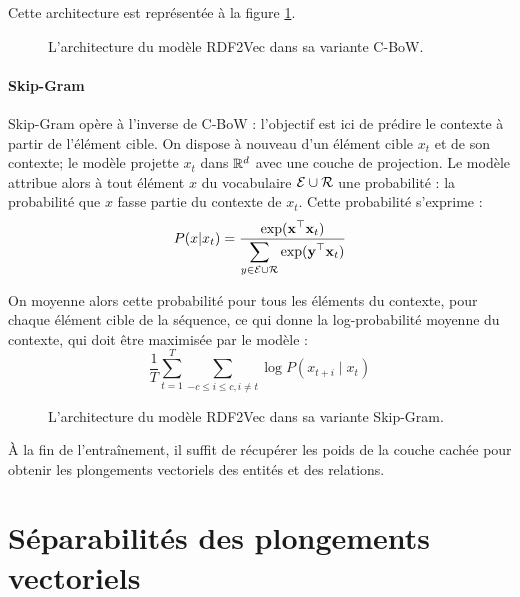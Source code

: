 Cette architecture est représentée à la figure \ref{fig:rdf2vec-cbow}.

\begin{figure}[h]
    \centering
    
    \caption[Architecture de RDF2Vec-CBoW]{L'architecture du modèle RDF2Vec dans sa variante C-BoW.}
    \label{fig:rdf2vec-cbow}
\end{figure}

\paragraph{Skip-Gram}

Skip-Gram opère à l'inverse de C-BoW : l'objectif est ici de prédire le contexte à partir de l'élément cible. On dispose à nouveau d'un élément cible $x_t$ et de son contexte; le modèle projette $x_t$ dans $\mathbb{R}^d$ avec une couche de projection. Le modèle attribue alors à tout élément $x$ du vocabulaire $\mathcal{E} \cup \mathcal{R}$ une probabilité : la probabilité que $x$ fasse partie du contexte de $x_t$. Cette probabilité s'exprime :
\begin{equation}
    P(x | x_t) = \frac{
    \displaystyle \exp(\mathbf{x}^\top \mathbf{x}_t)}
    {\displaystyle \sum_{y \in \mathcal{E} \cup \mathcal{R}} \exp(\mathbf{y}^\top \mathbf{x}_t)}
\end{equation}

On moyenne alors cette probabilité pour tous les éléments du contexte, pour chaque élément cible de la séquence, ce qui donne la log-probabilité moyenne du contexte, qui doit être maximisée par le modèle :
\begin{equation}
    \frac{1}{T} \sum_{t = 1}^{T} \sum_{-c \leq i \leq c, i \neq t} \log P(x_{t+i} \mid x_t)
\end{equation}

\begin{figure}[h]
    \centering
    
    \caption[Architecture de RDF2Vec-Skip-Gram]{L'architecture du modèle RDF2Vec dans sa variante Skip-Gram.}
    \label{fig:rdf2vec-skipgram}
\end{figure}

À la fin de l'entraînement, il suffit de récupérer les poids de la couche cachée pour obtenir les plongements vectoriels des entités et des relations.

\FloatBarrier


\section{Séparabilités des plongements vectoriels}


